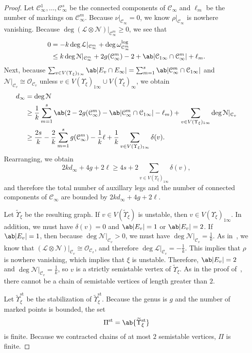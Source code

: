 \documentclass{amsart}
\theoremstyle{definition}
\theoremstyle{remark}
\theoremstyle{plain}
\theoremstyle{definition}
\theoremstyle{remark}
\newcommand{\mc}[1]{\mathcal{#1}}
\newcommand{\mr}[1]{\mathrm{#1}}
\newcommand{\wt}[1]{\widetilde{#1}}
\newcommand{\1}{\mathbf{1}}
\newcommand{\2}{\mathbf{2}}
\newcommand{\3}{\mathbf{3}}
\begin{document}
\begin{proof}
    Let $\mc{C}_{\infty}^1, \ldots, \mc{C}_{\infty}^s$ be the connected components of $\mc{C}_{\infty}$ and $\ell_m$ be the number of markings on $\mc{C}_{\infty}^m$. Because $\nu|_{\mc{C}_{\infty}} = 0$, we know $\rho|_{\mc{C}_{\infty}}$ is nowhere vanishing. Because $\deg (\mc{L}\otimes \mc{N})|_{\mc{C}_{\infty}^m} \geq 0$, we see that
    \begin{align*}
        0 &= -k \deg \mc{L}|_{\mc{C}_{\infty}^m} + \deg \omega_{\mc{C}_{\infty}^m}^{\log} \\
        &\leq k \deg \mc{N}|_{\mc{C}_{\infty}^m} + 2g(\mc{C}_{\infty}^m) - 2 + \ab\vert \mc{C}_{1\infty} \cap \mc{C}_{\infty}^m\vert + \ell_m.
    \end{align*}
    Next, because $\sum_{v \in V(\Upsilon_{\xi})_{1\infty}} \ab|E_v \cap E_{\infty}| = \sum_{m=1}^s \ab|\mc{C}_{\infty}^m \cap \mc{C}_{1\infty}|$ and $\mc{N}|_{\mc{C}_v} \cong \mc{O}_{\mc{C}_v}$ unless $v \in V(\Upsilon_{\xi})_{1\infty} \cup V(\Upsilon_{\xi})_{\infty}$, we obtain
    \begin{align*}
        d_{\infty} &= \deg \mc{N} \\
        &\geq \frac{1}{k} \sum_{m=1}^s \ab( 2-2g(\mc{C}_{\infty}^m) - \ab|\mc{C}_{\infty}^m \cap \mc{C}_{1\infty}| - \ell_m) + \sum_{v \in V(\Upsilon_{\xi})_{1\infty}} \deg \mc{N}|_{\mc{C}_v} \\
        &\geq \frac{2s}{k} - \frac{2}{k}\sum_{m=1}^s g(\mc{C}_{\infty}^m) - \frac{1}{k} \ell + \frac{1}{k} \sum_{v \in V(\Upsilon_{\xi})_{1\infty}} \delta(v).
    \end{align*}
    Rearranging, we obtain
    \[ 2kd_{\infty} + 4g + 2\ell \geq 4s + 2\sum_{v \in V(\Upsilon_{\xi})_{1\infty}} \delta(v), \]
    and therefore the total number of auxillary legs and the number of connected components of $\mc{C}_{\infty}$ are bounded by $2kd_{\infty} + 4g + 2\ell$.

    Let $\wt{\Upsilon}_{\xi}$ be the resulting graph. If $v \in V(\wt{\Upsilon}_{\xi})$ is unstable, then $v \in V(\Upsilon_{\xi})_{1\infty}$. In addition, we must have $\delta(v) = 0$ and $\ab|E_v| = 1$ or $\ab|E_v| = 2$. If $\ab|E_v| = 1$, then because $\deg \mc{N}|_{\mc{C}_v} > 0$, we must have $\deg \mc{N}|_{\mc{C}_v} = \frac{1}{k}$. As in~\cite[Lemma 4.4]{nmsp}, we know that $(\mc{L} \otimes \mc{N})|_{\mc{C}_v} \cong \mc{O}_{\mc{C}_v}$, and therefore $\deg \mc{L}|_{\mc{C}_v} = -\frac{1}{k}$. This implies that $\rho$ is nowhere vanishing, which implies that $\xi$ is unstable. Therefore, $\ab|E_v| = 2$ and $\deg \mc{N}|_{\mc{C}_v} = \frac{1}{k}$, so $v$ is a strictly semistable vertex of $\wt{\Upsilon}_{\xi}$. As in the proof of~\cite[Proposition 4.6]{mspfermat}, there cannot be a chain of semistable vertices of length greater than $2$.

    Let $\wt{\Upsilon}_{\xi}^{\mr{st}}$ be the stabilization of $\wt{\Upsilon}_{\xi}^{\mr{st}}$. Because the genus is $g$ and the number of marked points is bounded, the set
    \[ \Pi^{\mr{st}} = \ab\{ \wt{\Upsilon}_{\xi}^{\mr{st}}\} \]
    is finite. Because we contracted chains of at most $2$ semistable vertices, $\Pi$ is finite.
\end{proof}
\end{document}
